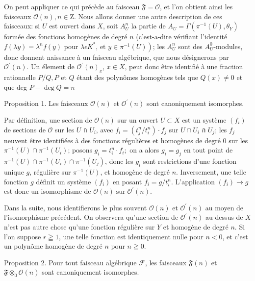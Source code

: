On peut appliquer ce qui précède au faisceau $\mathfrak{F}=\mathcal{O}$, et l'on obtient ainsi les faisceaux $\mathcal{O}(n), n \in \mathrm{Z}$. Nous allons donner une autre description de ces faisceaux: si $U$ est ouvert dans $X$, soit $A_{U}^{n}$ la partie de $A_{U}=\Gamma\left(\pi^{-1}(U), \theta_{Y}\right)$ formée des fonctions homogènes de degré $n$ (c'est-a-dire vérifiant l'identité $f(\lambda y)=\lambda^{n} f(y)$ pour $\lambda \epsilon K^{*}$, et $\left.y \in \pi^{-1}(U)\right)$; les $A_{U}^{n}$ sont des $A_{U}^{0}$-modules, donc donnent naissance à un faisceau algébrique, que nous désignerons par $\mathcal{O}^{\prime}(n)$. Un élement de $\mathcal{O}^{\prime}(n)_{x}$, $x \in X$, peut donc être identifié à une fraction rationnelle $P / Q, P$ et $Q$ étant des polynômes homogènes tels que $Q(x) \neq 0$ et que deg $P-\operatorname{deg} Q=n$

Proposition 1. Les faisceaux $\mathcal{O}(n)$ et $\mathcal{O}^{\prime}(n)$ sont canoniquement isomorphes.

Par définition, une section de $\mathcal{O}(n)$ sur un ouvert $U \subset X$ est un système $\left(f_{i}\right)$ de sections de $\mathcal{O}$ sur les $U$ ก $U_{i}$, avec $f_{i}=\left(t_{j}^{n} / t_{i}^{n}\right) \cdot f_{j}$ sur $U \cap U_{i}$ ก $U_{j}$; les $f_{j}$ neuvent être identifiées à des fonctions régulières et homogènes de degré 0 sur les $\pi^{-1}(U) \cap \pi^{-1}\left(U_{i}\right)$; posons $g_{i}=t_{i}^{n} \cdot f_{i} ;$ on a alors $g_{i}=g_{j}$ en tout point de $\pi^{-1}(U) \cap \pi^{-1}\left(U_{i}\right) \cap \pi^{-1}\left(U_{j}\right)$, donc les $g_{i}$ sont restrictions d'une fonction unique $g$, régulière sur $\pi^{-1}(U)$, et homogène de degré $n$. Inversement, une telle fonction $g$ définit un système $\left(f_{i}\right)$ en posant $f_{i}=g / t_{i}^{n} .$ L'application $\left(f_{i}\right) \rightarrow g$ est donc un isomorphisme de $\mathcal{O}(n) \operatorname{sur} \mathcal{O}^{\prime}(n)$.

Dans la suite, nous identifierons le plus souvent $\mathcal{O}(n)$ et $\mathcal{O}^{\prime}(n)$ au moyen de l'isomorphisme précédent. On observera qu'une section de $\mathcal{O}^{\prime}(n)$ au-dessus de $X$ n'est pas autre chose qu'une fonction régulière sur $Y$ et homogène de degré $n .$ Si l'on suppose $r \geqq 1$, une telle fonction est identiquement nulle pour $n<0$, et c'est un polynôme homogène de degré $n$ pour $n \geqq 0$.

Proposition 2. Pour tout faisceau algébrique $\mathcal{F}$, les faisceaux $\mathfrak{F}(n)$ et $\mathfrak{F} \otimes_{0} \mathcal{O}(n)$ sont canoniquement isomorphes.

